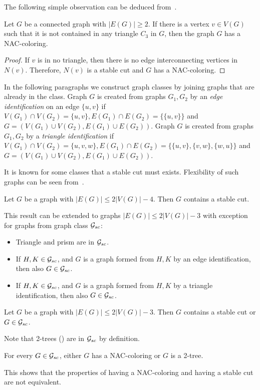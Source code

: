 The following simple observation can be deduced
from~.
%
\begin{corollary}
	Let \( G \) be a connected graph with \( |E(G)| \ge 2 \).
	If there is a vertex \( v \in V(G) \) such that it is
	not contained in any triangle \( C_3 \) in \( G \),
	then the graph \( G \) has a NAC-coloring.
\end{corollary}
%
\begin{proof}
	If \( v \) is in no triangle, then there is no edge interconnecting
	vertices in \( N(v) \). Therefore, \( N(v) \) is a stable cut and \( G \)
	has a NAC-coloring.
\end{proof}

In the following paragraphs we construct graph classes by joining graphs
that are already in the class.
Graph \( G \) is created from graphs \( G_1, G_2 \) by an \emph{edge identification}
on an edge \( \{u, v\} \)
if \( V(G_1) \cap V(G_2) = \{u, v\}, E(G_1) \cap E(G_2) = \{\{u, v\}\} \)
and \( G = (V(G_1) \cup V(G_2), E(G_1) \cup E(G_2)) \).
Graph \( G \) is created from graphs \( G_1, G_2 \) by a \emph{triangle identification}
if \( V(G_1) \cap V(G_2) = \{u, v, w\}, E(G_1) \cap E(G_2) = \{\{u, v\}, \{v, w\}, \{w, u\}\} \)
and \( G = (V(G_1) \cup V(G_2), E(G_1) \cup E(G_2)) \).

It is known for some classes that a stable cut must exists.
Flexibility of such graphs can be seen from~.
%
\begin{theorem}
	Let \( G \) be a graph with \( |E(G)| \le 2|V(G)|-4 \).
	Then \( G \) contains a stable cut.
\end{theorem}
%
This result can be extended to graphs \( |E(G)| \le 2|V(G)|-3 \) with exception
for graphs from graph class \( \mathcal{G}_{sc} \):
%
\begin{itemize}
	\item Triangle and prism are in \( \mathcal{G}_{sc} \).
	\item If \( H, K \in \mathcal{G}_{sc} \), and \( G \) is a graph
	      formed from \( H, K \) by an edge identification,
	      then also \( G \in \mathcal{G}_{sc} \).
	\item If \( H, K \in \mathcal{G}_{sc} \), and \( G \) is a graph
	      formed from \( H, K \) by a triangle identification,
	      then also \( G \in \mathcal{G}_{sc} \).
\end{itemize}
%
%
\begin{theorem}
	Let \( G \) be a graph with \( |E(G)| \le 2|V(G)|-3 \). Then \( G \) contains
	a stable cut or \( G \in \mathcal{G}_{sc} \).
\end{theorem}
%
Note that 2-trees ()
are in \( \mathcal{G}_{sc} \) by definition.
%
\begin{lemma}
	For every \( G \in \mathcal{G}_{sc} \), either \( G \) has a NAC-coloring
	or \( G \) is a 2-tree.
\end{lemma}
%
This shows that the properties of having a NAC-coloring and having a stable cut
are not equivalent.

